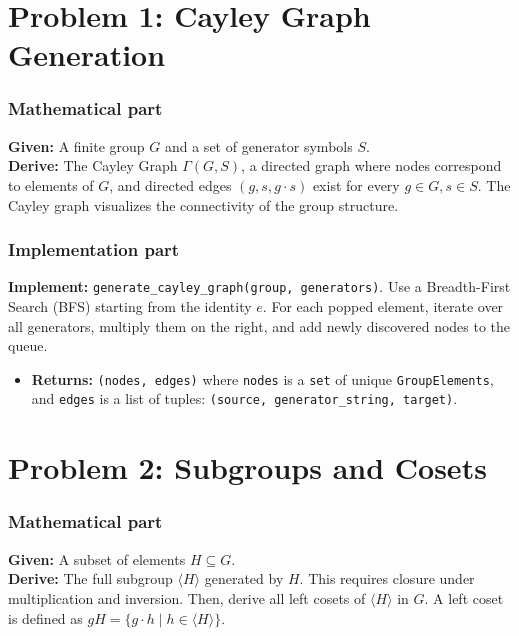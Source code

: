 \documentclass[11pt]{article}
\begin{document}
\section*{Problem 1: Cayley Graph Generation}

\subsubsection*{Mathematical part}
\textbf{Given:} A finite group $G$ and a set of generator symbols $S$. \\
\textbf{Derive:} The Cayley Graph $\Gamma(G, S)$, a directed graph where nodes correspond to elements of $G$, and directed edges $(g, s, g \cdot s)$ exist for every $g \in G, s \in S$. The Cayley graph visualizes the connectivity of the group structure.

\subsubsection*{Implementation part}
\textbf{Implement:} \lstinline|generate_cayley_graph(group, generators)|. Use a Breadth-First Search (BFS) starting from the identity $e$. For each popped element, iterate over all generators, multiply them on the right, and add newly discovered nodes to the queue.
\begin{itemize}
    \item \textbf{Returns:} \lstinline|(nodes, edges)| where \lstinline|nodes| is a \lstinline|set| of unique \lstinline|GroupElements|, and \lstinline|edges| is a list of tuples: \lstinline|(source, generator_string, target)|.
\end{itemize}

\section*{Problem 2: Subgroups and Cosets}

\subsubsection*{Mathematical part}
\textbf{Given:} A subset of elements $H \subseteq G$. \\
\textbf{Derive:} The full subgroup $\langle H \rangle$ generated by $H$. This requires closure under multiplication and inversion. Then, derive all left cosets of $\langle H \rangle$ in $G$. A left coset is defined as $gH = \{g \cdot h \mid h \in \langle H \rangle \}$.
\end{document}
